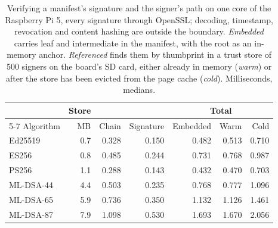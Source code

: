 \begin{table}[t]
\caption{Verifying a manifest's signature and the signer's path on one core of the Raspberry Pi 5, every signature through OpenSSL; decoding, timestamp, revocation and content hashing are outside the boundary. \emph{Embedded} carries leaf and intermediate in the manifest, with the root as an in-memory anchor. \emph{Referenced} finds them by thumbprint in a trust store of 500 signers on the board's SD card, either already in memory (\emph{warm}) or after the store has been evicted from the page cache (\emph{cold}). Milliseconds, medians.}
\label{tab:edge}
\begin{tabular}{lrrrrrr}
\toprule
 & Store & & & \multicolumn{3}{c}{Total}\\
\cmidrule(lr){5-7}
Algorithm & MB & Chain & Signature & Embedded & Warm & Cold\\
\midrule
Ed25519 & 0.7 & 0.328 & 0.150 & 0.482 & 0.513 & 0.710\\
ES256 & 0.8 & 0.485 & 0.244 & 0.731 & 0.768 & 0.987\\
PS256 & 1.1 & 0.288 & 0.143 & 0.432 & 0.470 & 0.703\\
ML-DSA-44 & 4.4 & 0.503 & 0.235 & 0.768 & 0.777 & 1.096\\
ML-DSA-65 & 5.9 & 0.736 & 0.350 & 1.132 & 1.126 & 1.461\\
ML-DSA-87 & 7.9 & 1.098 & 0.530 & 1.693 & 1.670 & 2.056\\
\bottomrule
\end{tabular}
\end{table}
